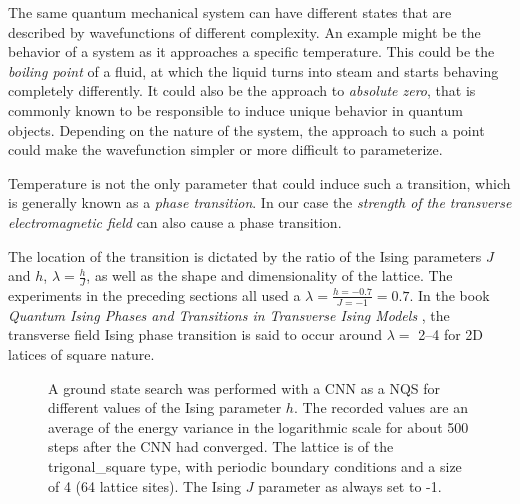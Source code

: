 The same quantum mechanical system can have different states that are described by wavefunctions of different complexity.
An example might be the behavior of a system as it approaches a specific temperature.
This could be the \emph{boiling point} of a fluid, at which the liquid turns into steam and starts behaving completely differently.
It could also be the approach to \emph{absolute zero}, that is commonly known to be responsible to induce unique behavior in quantum objects.
Depending on the nature of the system, the approach to such a point could make the wavefunction simpler or more difficult to parameterize.

Temperature is not the only parameter that could induce such a transition, which is generally known as a \emph{phase transition}.
In our case the \emph{strength of the transverse electromagnetic field} can also cause a phase transition.

The location of the transition is dictated by the ratio of the Ising parameters $J$ and $h$, $\lambda = \frac{h}{J}$, as well as the shape and dimensionality of the lattice.
The experiments in the preceding sections all used a $\lambda = \frac{h=-0.7}{J=-1} = 0.7$.
In the book \emph{Quantum Ising Phases and Transitions in Transverse Ising Models} \cite{isingBook}, the transverse field Ising phase transition is said to occur around $\lambda = $ \SIrange[]{2}{4}{} for 2D latices of square nature.

\begin{figure}[htbp]
    \centering
    \caption{
        A ground state search was performed with a CNN as a NQS for different values of the Ising parameter $h$.
        The recorded values are an average of the energy variance in the logarithmic scale for about 500 steps after the CNN had converged.
        The lattice is of the trigonal\_square type, with periodic boundary conditions and a size of 4 (64 lattice sites).
        The Ising $J$ parameter as always set to -1.
    }
    \label{fig:phase-transition}
\end{figure}

